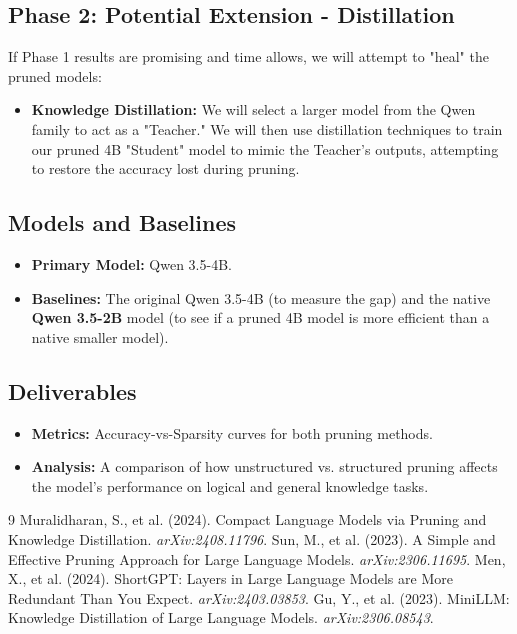 \documentclass[11pt,a4paper,twocolumn]{article}
\begin{document}
\subsection{Phase 2: Potential Extension - Distillation}
If Phase 1 results are promising and time allows, we will attempt to "heal" the pruned models:
\begin{itemize}
    \item \textbf{Knowledge Distillation:} We will select a larger model from the Qwen family to act as a "Teacher." We will then use distillation techniques to train our pruned 4B "Student" model to mimic the Teacher's outputs, attempting to restore the accuracy lost during pruning.
\end{itemize}

\subsection{Models and Baselines}
\begin{itemize}[noitemsep]
    \item \textbf{Primary Model:} Qwen 3.5-4B.
    \item \textbf{Baselines:} The original Qwen 3.5-4B (to measure the gap) and the native \textbf{Qwen 3.5-2B} model (to see if a pruned 4B model is more efficient than a native smaller model).
\end{itemize}

\subsection{Deliverables}
\begin{itemize}[noitemsep]
    \item \textbf{Metrics:} Accuracy-vs-Sparsity curves for both pruning methods.
    \item \textbf{Analysis:} A comparison of how unstructured vs. structured pruning affects the model's performance on logical and general knowledge tasks.
\end{itemize}

\begin{thebibliography}{9}
 Muralidharan, S., et al. (2024). Compact Language Models via Pruning and Knowledge Distillation. \textit{arXiv:2408.11796}.
 Sun, M., et al. (2023). A Simple and Effective Pruning Approach for Large Language Models. \textit{arXiv:2306.11695}.
 Men, X., et al. (2024). ShortGPT: Layers in Large Language Models are More Redundant Than You Expect. \textit{arXiv:2403.03853}.
 Gu, Y., et al. (2023). MiniLLM: Knowledge Distillation of Large Language Models. \textit{arXiv:2306.08543}.
\end{thebibliography}
\end{document}
